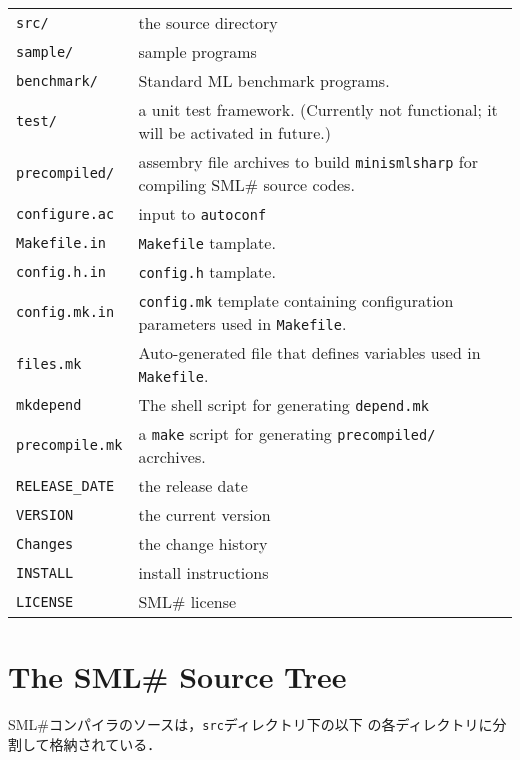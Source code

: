 \documentclass{jbook}
\newif\ifjp
\newcommand{\txt}[2]{#2}
\newcommand{\smlsharp}{SML\#}
\newcommand{\code}[1]{\mbox{\large\tt #1}}
\begin{document}
\begin{tabular}{ll}
\code{src/} & the source directory
\\
\code{sample/} & sample programs
\\
\code{benchmark/} & Standard ML benchmark programs.
\\
\code{test/} & a unit test framework. (Currently not functional; it will
be activated in future.)
\\
\code{precompiled/} & assembry file archives to build
\code{minismlsharp} for compiling \smlsharp{} source codes.
\\
\code{configure.ac} & input to \code{autoconf}
\\
\code{Makefile.in} & \code{Makefile} tamplate.
\\
\code{config.h.in} & \code{config.h} tamplate.
\\
\code{config.mk.in} &
	\code{config.mk} template containing configuration parameters used in \code{Makefile}.
\\
\code{files.mk} & Auto-generated file that defines variables used in
\code{Makefile}.
\\
\code{mkdepend} & The shell script for generating \code{depend.mk}
\\
\code{precompile.mk} & a \code{make} script for generating
    \code{precompiled/} acrchives.
\\
\code{RELEASE\_DATE} & the release date
\\
\code{VERSION} &  the current version
\\
\code{Changes} &  the change history
\\
\code{INSTALL} & install instructions
\\
\code{LICENSE} & \smlsharp{} license
\end{tabular}
\fi%

\section{\txt
{\smlsharp{} ソースツリー}
{The \smlsharp{} Source Tree}
}

\ifjp%
	\smlsharp{}コンパイラのソースは，\code{src}ディレクトリ下の以下
の各ディレクトリに分割して格納されている．
\end{document}
